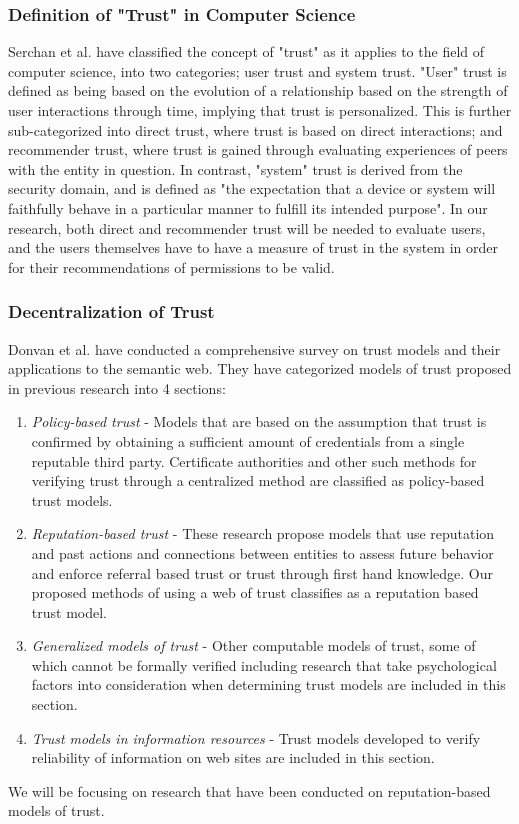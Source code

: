 \subsubsection{Definition of "Trust" in Computer Science}
Serchan et al. have classified the concept of "trust" as it applies to the field of computer science, into two categories; user trust and system trust\cite{sherchan2013survey}. "User" trust is defined as being based on the evolution of a relationship based on the strength of user interactions through time, implying that trust is personalized. This is further sub-categorized into direct trust, where trust is based on direct interactions; and recommender trust, where trust is gained through evaluating experiences of peers with the entity in question. In contrast, "system" trust is derived from the security domain, and is defined as "the expectation that a device or system will faithfully behave in a particular manner to fulfill its intended purpose". In our research, both direct and recommender trust will be needed to evaluate users, and the users themselves have to have a measure of trust in the system in order for their recommendations of permissions to be valid. 

\subsubsection{Decentralization of Trust}
Donvan et al. have conducted a comprehensive survey on trust models and their applications to the semantic web\cite{artz2007survey}. They have categorized models of trust proposed in previous research into 4 sections:
\begin{enumerate}
\item \textit{Policy-based trust} - Models that are based on the assumption that trust is confirmed by obtaining a sufficient amount of credentials from a single reputable third party. Certificate authorities and other such methods for verifying trust through a centralized method are classified as policy-based trust models.
\item \textit{Reputation-based trust} - These research propose models that use reputation and past actions and connections between entities to assess future behavior and enforce referral based trust or trust through first hand knowledge. Our proposed methods of  using a web of trust classifies as a reputation based trust model.
\item \textit{Generalized models of trust} - Other computable models of trust, some of which cannot be formally verified including research that take psychological factors into consideration when determining trust models are included in this section.
\item \textit{Trust models in information resources} - Trust models developed to verify reliability of information on web sites are included in this section. 
\end{enumerate}
We will be focusing on research that have been conducted on reputation-based models of trust. 

